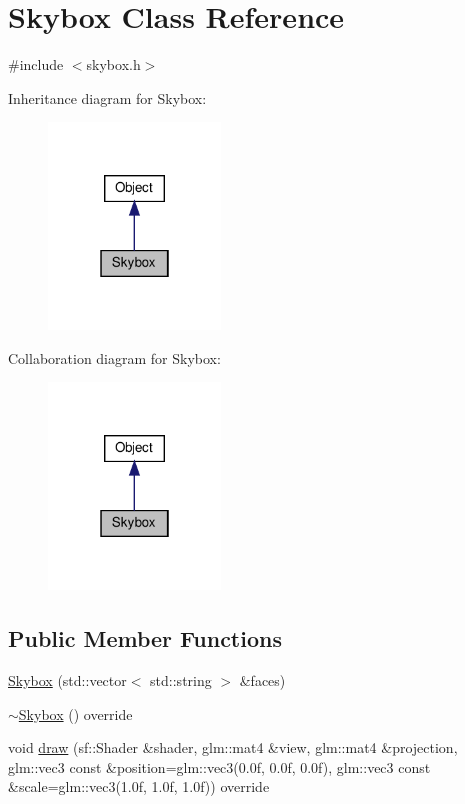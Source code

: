\hypertarget{classSkybox}{}\section{Skybox Class Reference}
\label{classSkybox}


{\ttfamily \#include $<$skybox.\+h$>$}



Inheritance diagram for Skybox\+:\nopagebreak
\begin{figure}[H]
\begin{center}
\leavevmode
\includegraphics[width=130pt]{classSkybox__inherit__graph}
\end{center}
\end{figure}


Collaboration diagram for Skybox\+:\nopagebreak
\begin{figure}[H]
\begin{center}
\leavevmode
\includegraphics[width=130pt]{classSkybox__coll__graph}
\end{center}
\end{figure}
\subsection*{Public Member Functions}
\begin{DoxyCompactItemize}
\item 
\hyperlink{classSkybox_a9bec390deb9a0f6bd4d8f99237ef6e97}{Skybox} (std\+::vector$<$ std\+::string $>$ \&faces)
\item 
\hyperlink{classSkybox_ae5c2aa5802d7ff5d71192643851a4fd7}{$\sim$\+Skybox} () override
\item 
void \hyperlink{classSkybox_a6263a420c7ec39e284342988679d3807}{draw} (sf\+::\+Shader \&shader, glm\+::mat4 \&view, glm\+::mat4 \&projection, glm\+::vec3 const \&position=glm\+::vec3(0.\+0f, 0.\+0f, 0.\+0f), glm\+::vec3 const \&scale=glm\+::vec3(1.\+0f, 1.\+0f, 1.\+0f)) override
\end{DoxyCompactItemize}

